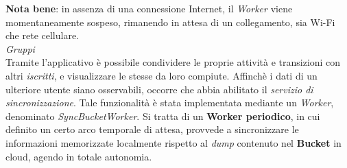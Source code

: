 \documentclass{article}
\begin{document}
    \textbf{Nota bene}: in assenza di una connessione Internet, il \textit{Worker} viene momentaneamente sospeso, rimanendo in attesa di un collegamento, sia Wi-Fi che rete cellulare. \vspace*{7pt}\\
    \textit{Gruppi} \vspace*{7pt}\\
    Tramite l'applicativo è possibile condividere le proprie attività e transizioni con altri \textit{iscritti}, e visualizzare le stesse da loro compiute. Affinchè i dati di un ulteriore utente siano osservabili, occorre che abbia abilitato il \textit{servizio di sincronizzazione}. Tale funzionalità è stata implementata mediante un \textit{Worker}, denominato \textit{SyncBucketWorker}. Si tratta di un \textbf{Worker periodico}, in cui definito un certo arco temporale di attesa, provvede a sincronizzare le informazioni memorizzate localmente rispetto al \textit{dump} contenuto nel \textbf{Bucket} in cloud, agendo in totale autonomia.
    \begin{center}
        \begin{figure}[H]
            \centering
        \end{figure}
    \end{center}
\end{document}
